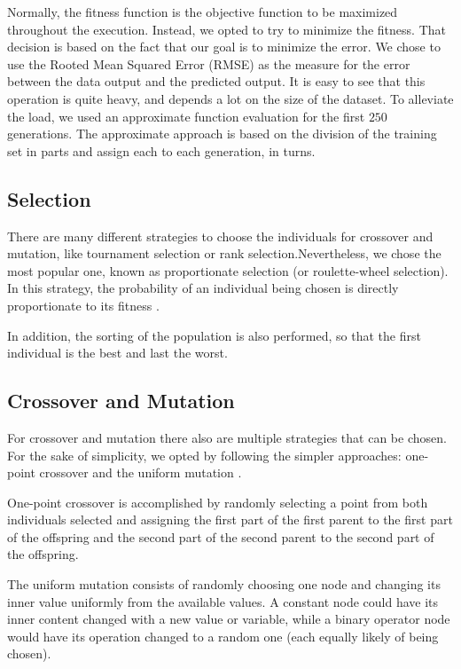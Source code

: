 \documentclass[runningheads]{llncs}
\begin{document}
Normally, the fitness function is the objective function to be maximized throughout the execution. Instead, we opted to try to minimize the fitness. That decision is based on the fact that our goal is to minimize the error. We chose to use the Rooted Mean Squared Error (RMSE) as the measure for the error between the data output and the predicted output. It is easy to see that this operation is quite heavy, and depends a lot on the size of the dataset. To alleviate the load, we used an approximate function evaluation \cite{beasley1993overview} for the first $250$ generations. The approximate approach is based on the division of the training set in parts and assign each to each generation, in turns.

\subsection{Selection}

There are many different strategies to choose the individuals for crossover and mutation, like tournament selection or rank selection.Nevertheless, we chose the most popular one, known as proportionate selection (or roulette-wheel selection). In this strategy, the probability of an individual being chosen is directly proportionate to its fitness \cite{martins2016gacuda}.

In addition, the sorting of the population is also performed, so that the first individual is the best and last the worst.

\subsection{Crossover and Mutation}

For crossover and mutation there also are multiple strategies that can be chosen. For the sake of simplicity, we opted by following the simpler approaches: one-point crossover and the uniform mutation \cite{martins2016gacuda}.

One-point crossover is accomplished by randomly selecting a point from both individuals selected and assigning the first part of the first parent to the first part of the offspring and the second part of the second parent to the second part of the offspring.

The uniform mutation consists of randomly choosing one node and changing its inner value uniformly from the available values. A constant node could have its inner content changed with a new value or variable, while a binary operator node would have its operation changed to a random one (each equally likely of being chosen).
\end{document}
